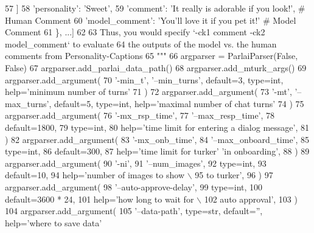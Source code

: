 \begin{DoxyCode}
57 \textcolor{stringliteral}{            ]}
58 \textcolor{stringliteral}{            'personality': 'Sweet',}
59 \textcolor{stringliteral}{            'comment': 'It really is adorable if you look!', # Human Comment}
60 \textcolor{stringliteral}{            'model\_comment': 'You'll love it if you pet it!' # Model Comment}
61 \textcolor{stringliteral}{        \}, ...]}
62 \textcolor{stringliteral}{}
63 \textcolor{stringliteral}{        Thus, you would specify `-ck1 comment -ck2 model\_comment` to evaluate}
64 \textcolor{stringliteral}{        the outputs of the model vs. the human comments from Personality-Captions}
65 \textcolor{stringliteral}{    """}
66     argparser = ParlaiParser(\textcolor{keyword}{False}, \textcolor{keyword}{False})
67     argparser.add\_parlai\_data\_path()
68     argparser.add\_mturk\_args()
69     argparser.add\_argument(
70         \textcolor{stringliteral}{'-min\_t'}, \textcolor{stringliteral}{'--min\_turns'}, default=3, type=int, help=\textcolor{stringliteral}{'minimum number of turns'}
71     )
72     argparser.add\_argument(
73         \textcolor{stringliteral}{'-mt'}, \textcolor{stringliteral}{'--max\_turns'}, default=5, type=int, help=\textcolor{stringliteral}{'maximal number of chat turns'}
74     )
75     argparser.add\_argument(
76         \textcolor{stringliteral}{'-mx\_rsp\_time'},
77         \textcolor{stringliteral}{'--max\_resp\_time'},
78         default=1800,
79         type=int,
80         help=\textcolor{stringliteral}{'time limit for entering a dialog message'},
81     )
82     argparser.add\_argument(
83         \textcolor{stringliteral}{'-mx\_onb\_time'},
84         \textcolor{stringliteral}{'--max\_onboard\_time'},
85         type=int,
86         default=300,
87         help=\textcolor{stringliteral}{'time limit for turker'} \textcolor{stringliteral}{'in onboarding'},
88     )
89     argparser.add\_argument(
90         \textcolor{stringliteral}{'-ni'},
91         \textcolor{stringliteral}{'--num\_images'},
92         type=int,
93         default=10,
94         help=\textcolor{stringliteral}{'number of images to show \(\backslash\)}
95 \textcolor{stringliteral}{                           to turker'},
96     )
97     argparser.add\_argument(
98         \textcolor{stringliteral}{'--auto-approve-delay'},
99         type=int,
100         default=3600 * 24,
101         help=\textcolor{stringliteral}{'how long to wait for  \(\backslash\)}
102 \textcolor{stringliteral}{                           auto approval'},
103     )
104     argparser.add\_argument(
105         \textcolor{stringliteral}{'--data-path'}, type=str, default=\textcolor{stringliteral}{''}, help=\textcolor{stringliteral}{'where to save data'}

\end{DoxyCode}
